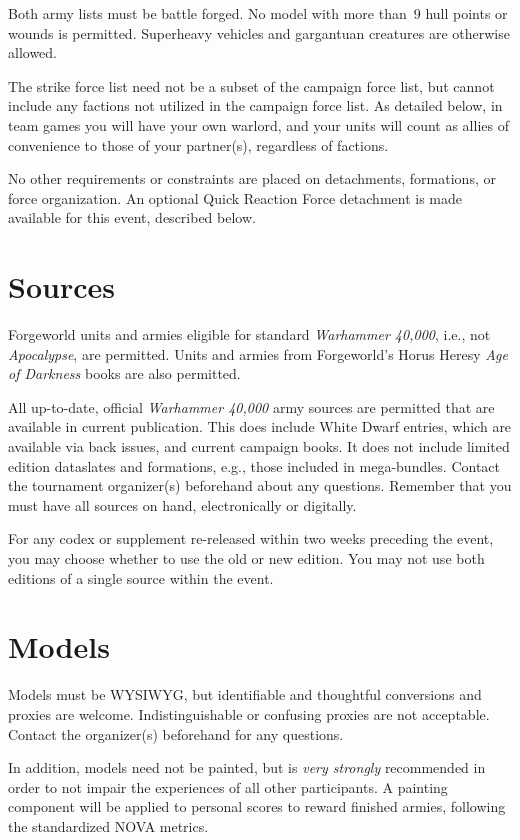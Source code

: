\documentclass{novanarrative}
\begin{document}
Both army lists must be battle forged.  No model with more than~9 hull
points or wounds is permitted.  Superheavy vehicles and gargantuan
creatures are otherwise allowed.

The strike force list need not be a subset of the campaign force list,
but cannot include any factions not utilized in the campaign force
list.  As detailed below, in team games you will have your own
warlord, and your units will count as allies of convenience to those
of your partner(s), regardless of factions.

No other requirements or constraints are placed on detachments,
formations, or force organization. An optional Quick Reaction Force
detachment is made available for this event, described below.

\section{Sources}

Forgeworld units and armies eligible for standard \textit{Warhammer
  40,000}, i.e., not \textit{Apocalypse}, are permitted. Units and
armies from Forgeworld's Horus Heresy \textit{Age of Darkness} books
are also permitted.

All up-to-date, official \textit{Warhammer 40,000} army sources are
permitted that are available in current publication. This does include
White Dwarf entries, which are available via back issues, and current
campaign books. It does not include limited edition dataslates and
formations, e.g., those included in mega-bundles. Contact the
tournament organizer(s) beforehand about any questions. Remember that
you must have all sources on hand, electronically or digitally.

For any codex or supplement re-released within two weeks preceding the
event, you may choose whether to use the old or new edition. You may
not use both editions of a single source within the event.

\section{Models}

Models must be WYSIWYG, but identifiable and thoughtful conversions
and proxies are welcome. Indistinguishable or confusing proxies are
not acceptable.  Contact the organizer(s) beforehand for any
questions.

In addition, models need not be painted, but is \textit{very strongly}
recommended in order to not impair the experiences of all other
participants.  A painting component will be applied to personal scores
to reward finished armies, following the standardized NOVA metrics.
\end{document}
